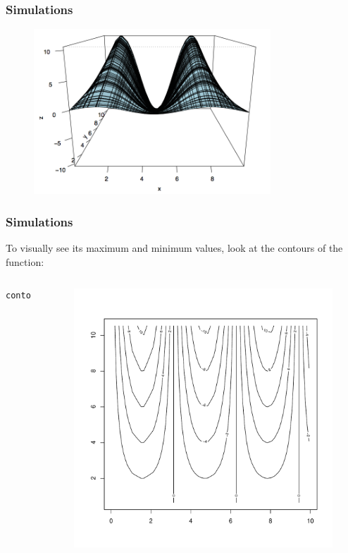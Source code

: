 \begin{frame}[fragile]
\frametitle{Simulations}
   \begin{figure}[ht]
       \begin{center}
		\includegraphics[width = 3.5in]{images/simulation.png}
	\end{center}
   \end{figure}
\end{frame}

\begin{frame}[fragile]
\frametitle{Simulations}
To visually see its maximum and minimum values, look at the contours of the function:

    \begin{columns}[Tc]

\begin{lstlisting}
contour(x,y,z)
\end{lstlisting}

   \begin{figure}[ht]
       \begin{center}
		\includegraphics[scale=0.33]{images/contourSim.pdf}
	\end{center}
   \end{figure}
\end{columns}

\end{frame}


